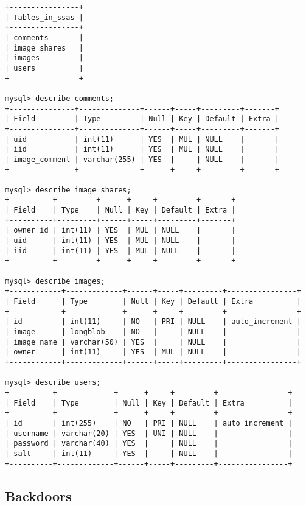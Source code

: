 \documentclass{article}
\begin{document}
\begin{verbatim}
+----------------+
| Tables_in_ssas |
+----------------+
| comments       |
| image_shares   |
| images         |
| users          |
+----------------+

mysql> describe comments;
+---------------+--------------+------+-----+---------+-------+
| Field         | Type         | Null | Key | Default | Extra |
+---------------+--------------+------+-----+---------+-------+
| uid           | int(11)      | YES  | MUL | NULL    |       |
| iid           | int(11)      | YES  | MUL | NULL    |       |
| image_comment | varchar(255) | YES  |     | NULL    |       |
+---------------+--------------+------+-----+---------+-------+

mysql> describe image_shares;
+----------+---------+------+-----+---------+-------+
| Field    | Type    | Null | Key | Default | Extra |
+----------+---------+------+-----+---------+-------+
| owner_id | int(11) | YES  | MUL | NULL    |       |
| uid      | int(11) | YES  | MUL | NULL    |       |
| iid      | int(11) | YES  | MUL | NULL    |       |
+----------+---------+------+-----+---------+-------+

mysql> describe images;
+------------+-------------+------+-----+---------+----------------+
| Field      | Type        | Null | Key | Default | Extra          |
+------------+-------------+------+-----+---------+----------------+
| id         | int(11)     | NO   | PRI | NULL    | auto_increment |
| image      | longblob    | NO   |     | NULL    |                |
| image_name | varchar(50) | YES  |     | NULL    |                |
| owner      | int(11)     | YES  | MUL | NULL    |                |
+------------+-------------+------+-----+---------+----------------+

mysql> describe users;
+----------+-------------+------+-----+---------+----------------+
| Field    | Type        | Null | Key | Default | Extra          |
+----------+-------------+------+-----+---------+----------------+
| id       | int(255)    | NO   | PRI | NULL    | auto_increment |
| username | varchar(20) | YES  | UNI | NULL    |                |
| password | varchar(40) | YES  |     | NULL    |                |
| salt     | int(11)     | YES  |     | NULL    |                |
+----------+-------------+------+-----+---------+----------------+
\end{verbatim}

\subsection{Backdoors}
\end{document}
